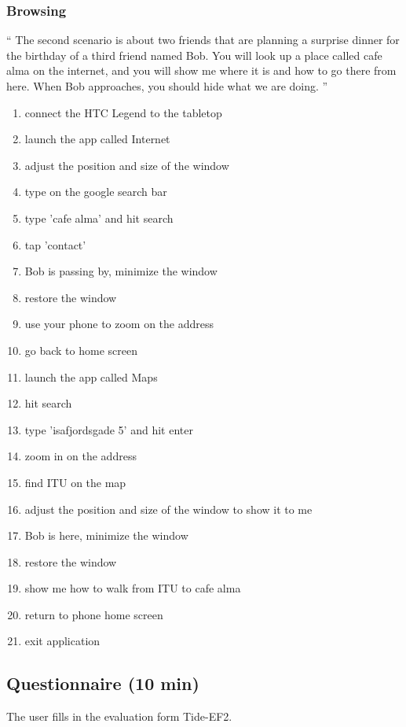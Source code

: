 \subsubsection{Browsing}

``
The second scenario is about two friends that are planning a surprise dinner for the birthday of a third friend named Bob. 
You will look up a place called cafe alma on the internet, and you will show me where it is and how to go there from here.
When Bob approaches, you should hide what we are doing.
''

\begin{enumerate}
\item connect the HTC Legend to the tabletop
\item launch the app called Internet
\item adjust the position and size of the window
\item type on the google search bar
\item type 'cafe alma' and hit search
\item tap 'contact'
\item Bob is passing by, minimize the window
\item restore the window
\item use your phone to zoom on the address
\item go back to home screen
\item launch the app called Maps
\item hit search
\item type 'isafjordsgade 5' and hit enter
\item zoom in on the address
\item find ITU on the map
\item adjust the position and size of the window to show it to me
\item Bob is here, minimize the window
\item restore the window
\item show me how to walk from ITU to cafe alma
\item return to phone home screen
\item exit application
\end{enumerate}

\subsection{Questionnaire (10 min)}

The user fills in the evaluation form Tide-EF2.

